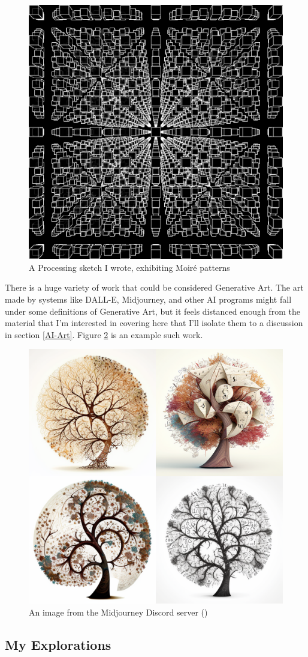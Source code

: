 \documentclass[12pt,twoside]{reedthesis}
\begin{document}
	\begin{figure}[h]
	\centering
	\includegraphics[width=0.7\linewidth]{Images/Grid}
	\caption{A Processing sketch I wrote, exhibiting Moiré patterns}
	\label{Grid}
	\end{figure}
	
	There is a huge variety of work that could be considered Generative Art. The art made by systems like DALL-E, Midjourney, and other AI programs might fall under some definitions of Generative Art, but it feels distanced enough from the material that I'm interested in covering here that I'll isolate them to a discussion in section \ref{AI-Art}. Figure \ref{Midjourney} is an example such work.
	
	\begin{figure}[h]
	\centering
	\includegraphics[width=0.4\linewidth]{Images/MidjourneyMathTree}
	\caption{An image from the Midjourney Discord server (\cite{midjourney2023})}
	\label{Midjourney}
	\end{figure}
	
\subsection{My Explorations} %
	
\end{document}
